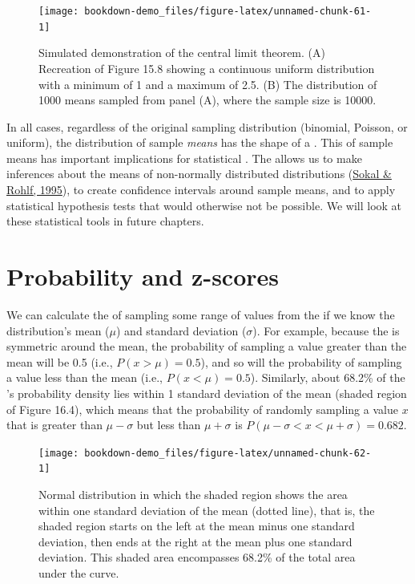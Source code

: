 \documentclass[
  openany]{krantz}
\begin{document}
\begin{figure}
\texttt{[image: bookdown-demo\_files/figure-latex/unnamed-chunk-61-1]} \caption{Simulated demonstration of the central limit theorem. (A) Recreation of Figure 15.8 showing a continuous uniform distribution with a minimum of 1 and a maximum of 2.5. (B) The distribution of 1000 means sampled from panel (A), where the sample size is 10000.}\label{fig:unnamed-chunk-61}
\end{figure}

In all cases, regardless of the original sampling distribution (binomial, Poisson, or uniform), the distribution of sample \emph{means} has the shape of a .
This  of sample means has important implications for statistical .
The  allows us to make inferences about the means of non-normally distributed distributions (\protect\hyperlink{ref-Sokal1995}{Sokal \& Rohlf, 1995}), to create confidence intervals around sample means, and to apply statistical hypothesis tests that would otherwise not be possible.
We will look at these statistical tools in future chapters.

\hypertarget{probability-and-z-scores}{%
\section{Probability and z-scores}\label{probability-and-z-scores}}

We can calculate the  of sampling some range of values from the  if we know the distribution's mean (\(\mu\)) and standard deviation (\(\sigma\)).
For example, because the  is symmetric around the mean, the probability of sampling a value greater than the mean will be 0.5 (i.e., \(P(x > \mu) = 0.5\)), and so will the probability of sampling a value less than the mean (i.e., \(P(x < \mu) = 0.5\)).
Similarly, about 68.2\% of the 's probability density lies within 1 standard deviation of the mean (shaded region of Figure 16.4), which means that the probability of randomly sampling a value \(x\) that is greater than \(\mu - \sigma\) but less than \(\mu + \sigma\) is \(P(\mu - \sigma < x < \mu + \sigma) = 0.682\).

\begin{figure}
\texttt{[image: bookdown-demo\_files/figure-latex/unnamed-chunk-62-1]} \caption{Normal distribution in which the shaded region shows the area within one standard deviation of the mean (dotted line), that is, the shaded region starts on the left at the mean minus one standard deviation, then ends at the right at the mean plus one standard deviation. This shaded area encompasses 68.2\% of the total area under the curve.}\label{fig:unnamed-chunk-62}
\end{figure}
\end{document}
